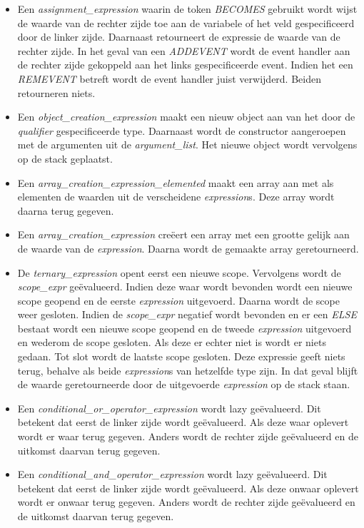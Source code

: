 \begin{itemize}
	\item Een \textit{assignment\_expression} waarin de token \textit{BECOMES} gebruikt wordt wijst de waarde van de rechter zijde toe aan de variabele of het veld gespecificeerd door de linker zijde. Daarnaast retourneert de expressie de waarde van de rechter zijde. In het geval van een \textit{ADDEVENT} wordt de event handler aan de rechter zijde gekoppeld aan het links gespecificeerde event. Indien het een \textit{REMEVENT} betreft wordt de event handler juist verwijderd. Beiden retourneren niets.
	\item Een \textit{object\_creation\_expression} maakt een nieuw object aan van het door de \textit{qualifier} gespecificeerde type. Daarnaast wordt de constructor aangeroepen met de argumenten uit de \textit{argument\_list}. Het nieuwe object wordt vervolgens op de stack geplaatst.
	\item Een \textit{array\_creation\_expression\_elemented} maakt een array aan met als elementen de waarden uit de verscheidene \textit{expression}s. Deze array wordt daarna terug gegeven.
	\item Een \textit{array\_creation\_expression} cre\"eert een array met een grootte gelijk aan de waarde van de \textit{expression}. Daarna wordt de gemaakte array geretourneerd.
	\item De \textit{ternary\_expression} opent eerst een nieuwe scope. Vervolgens wordt de \textit{scope\_expr} ge\"evalueerd. Indien deze waar wordt bevonden wordt een nieuwe scope geopend en de eerste \textit{expression} uitgevoerd. Daarna wordt de scope weer gesloten. Indien de \textit{scope\_expr} negatief wordt bevonden en er een \textit{ELSE} bestaat wordt een nieuwe scope geopend en de tweede \textit{expression} uitgevoerd en wederom de scope gesloten. Als deze er echter niet is wordt er niets gedaan. Tot slot wordt de laatste scope gesloten. Deze expressie geeft niets terug, behalve als beide \textit{expression}s van hetzelfde type zijn. In dat geval blijft de waarde geretourneerde door de uitgevoerde \textit{expression} op de stack staan.
	\item Een \textit{conditional\_or\_operator\_expression} wordt lazy ge\"evalueerd. Dit betekent dat eerst de linker zijde wordt ge\"evalueerd. Als deze waar oplevert wordt er waar terug gegeven. Anders wordt de rechter zijde ge\"evalueerd en de uitkomst daarvan terug gegeven.
	\item Een \textit{conditional\_and\_operator\_expression} wordt lazy ge\"evalueerd. Dit betekent dat eerst de linker zijde wordt ge\"evalueerd. Als deze onwaar oplevert wordt er onwaar terug gegeven. Anders wordt de rechter zijde ge\"evalueerd en de uitkomst daarvan terug gegeven.

\end{itemize}
